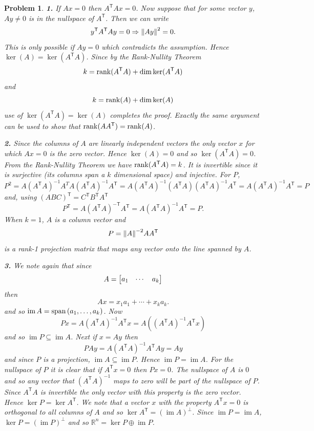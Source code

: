 \documentclass{article}
\newcommand{\subno}[1]{\par\noindent\textbf{#1}}
\newcommand{\T}{\mathsf{T}}
\newcommand{\R}{\mathbb{R}}
\DeclareMathOperator{\im}{im}
\DeclareMathOperator{\sspan}{span}
\theoremstyle{pprop}
\newtheorem{problem}{Problem}[section]
\begin{document}
\begin{problem} 
  \subno{1.} If $Ax=0$ then $A^\T Ax =0$. Now suppose that for some vector $y$, $Ay \neq 0$ is in the nullspace of $A^\T$. 
  Then we can write  
  \[
  y^\T A^\T A y =0 \Rightarrow \norm{A y}^2=0.
  \]
  This is only possible if $Ay=0$ which contradicts the assumption. Hence $\ker(A) = \ker(A^\T A)$. Since by the Rank-Nullity Theorem
  \[
   k = \rank(A^\T A) + \dim\ker(A^\T A)  
  \]
  and 
  \[
   k = \rank(A) + \dim\ker( A)  
  \]
  use of $\ker(A^\T A)=\ker(A)$ completes the proof. Exactly the same argument can be used to show that $\rank(A A^\T)=\rank(A)$.
\subno{2.} Since the columns of $A$ are linearly independent vectors the only vector $x$ for which $Ax=0$ is the zero vector.
  Hence $\ker(A)=\qty{0}$ and so $\ker(A^\T A)=\qty{0}$. From the Rank-Nullity Theorem we have $\rank(A^\T A)=k$. It is invertible 
  since it is surjective (its columns span a $k$ dimensional space) and injective.
  For $P$, 
  \[
  P^2 = A(A^\T A)^{-1} A^T A(A^\T A)^{-1} A^\T  =
  A(A^\T A)^{-1} (A^\T A)(A^\T A)^{-1} A^\T= A(A^\T A)^{-1} A^\T = P 
  \]
  and, using $(ABC)^\T=C^\T B^\T A^\T$
  \[
  P^\T = A (A^\T A)^{-\T} A^\T = A (A^\T A)^{-1} A^\T = P.
  \]
  When $k=1$, $A$ is a column vector and 
  \[
  P = \norm{A}^{-2}AA^\T
  \]
  is a rank-1 projection matrix that maps any vector onto the line spanned by $A$.
\subno{3.} We note again that since 
\[
A = \mqty[ a_1 & \cdots & a_k]
\]  
then 
\[
A x = x_1 a_1 + \cdots + x_k a_k.
\]
and so $\im A = \sspan \qty(a_1, \ldots, a_k)$.
Now 
$$
P x = A(A^\T A)^{-1} A^\T x = A((A^\T A)^{-1} A^\T x) 
$$
and so $\im P \subseteq \im A$. Next if $x=Ay$ then 
\[
P Ay = A(A^\T A)^{-1} A^\T A y = Ay 
\] 
and since $P$ is a projection, $\im A \subseteq \im P$. Hence $\im P = \im A$. For the nullspace of $P$ 
it is clear that if $A^\T x =0$ then $P x =0$. The nullspace of $A$ is $\qty{0}$ and so any vector that 
$(A^\T A)^{-1}$ maps to zero will be part of the nullspace of $P$. Since $A^\T A$ is invertible the only vector 
with this property is the zero vector. Hence $\ker P = \ker A^\T$. We note that a vector $x$ with the property 
$A^\T x=0$ is orthogonal to all columns of $A$ and so $\ker A^\T = (\im A)^\perp$. Since $\im P = \im A$, $\ker P = (\im P)^\perp$ 
and so $\R^n = \ker P \oplus \im P$.
\end{problem}  
\end{document}
